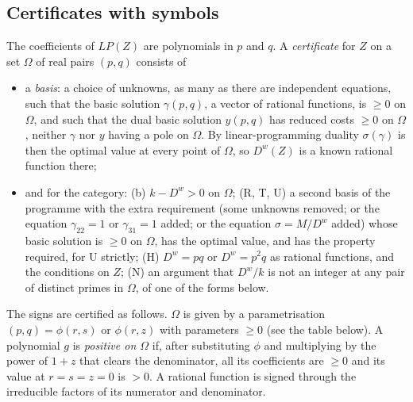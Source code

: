 \documentclass[11pt,a4paper]{amsart}
\theoremstyle{definition}
\theoremstyle{remark}
\newcommand{\Dw}{D^{w}}
\begin{document}
\subsection{Certificates with symbols}\label{ss:sym} The coefficients of $LP(Z)$ are polynomials in $p$ and
$q$. A \emph{certificate} for $Z$ on a set $\Omega$ of real pairs $(p,q)$ consists of
\begin{itemize}
\item a \emph{basis}: a choice of unknowns, as many as there are independent equations, such that the basic
solution $\gamma(p,q)$, a vector of rational functions, is $\ge0$ on $\Omega$, and such that the dual basic
solution $y(p,q)$ has reduced costs $\ge0$ on $\Omega$, neither $\gamma$ nor $y$ having a pole on $\Omega$. By
linear-programming duality $\sigma(\gamma)$ is then the optimal value at every point of $\Omega$, so $\Dw(Z)$ is
a known rational function there;
\item and for the category: (b) $k-\Dw>0$ on $\Omega$; (R, T, U) a second basis of the programme with the
extra requirement (some unknowns removed; or the equation $\gamma_{22}=1$ or $\gamma_{31}=1$ added; or the
equation $\sigma=M/\Dw$ added) whose basic solution is $\ge0$ on $\Omega$, has the optimal value, and has the
property required, for U strictly; (H) $\Dw=pq$ or $\Dw=p^2q$ as rational functions, and the conditions on $Z$;
(N) an argument that $\Dw/k$ is not an integer at any pair of distinct primes in $\Omega$, of one of the forms
below.
\end{itemize}
The signs are certified as follows. $\Omega$ is given by a parametrisation $(p,q)=\phi(r,s)$ or $\phi(r,z)$ with
parameters $\ge0$ (see the table below). A polynomial $g$ is \emph{positive on $\Omega$} if, after substituting
$\phi$ and multiplying by the power of $1+z$ that clears the denominator, all its coefficients are $\ge0$ and its
value at $r=s=z=0$ is $>0$. A rational function is signed through the irreducible factors of its numerator and
denominator.
\end{document}
